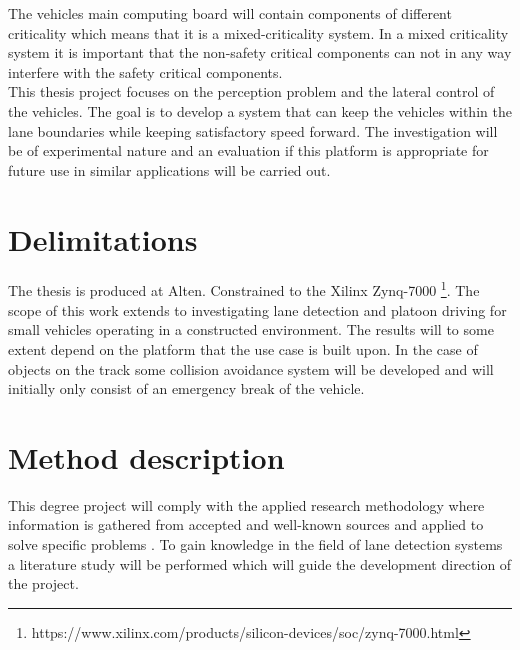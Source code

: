 The vehicles main computing board will contain components of different criticality which means that it is a mixed-criticality system. In a mixed criticality system it is important that the non-safety critical components can not in any way interfere with the safety critical components.\\


This thesis project focuses on the perception problem and the lateral control of the vehicles. The goal is to develop a system that can keep the vehicles within the lane boundaries while keeping satisfactory speed forward. The investigation will be of experimental nature and an evaluation if this platform is appropriate for future use in similar applications will be carried out.





\section{Delimitations}
The thesis is produced at Alten. Constrained to the Xilinx Zynq-7000 \footnote{https://www.xilinx.com/products/silicon-devices/soc/zynq-7000.html}. The scope of this work extends to investigating lane detection and platoon driving for small vehicles operating in a constructed environment. The results will to some extent depend on the platform that the use case is built upon. In the case of objects on the track some collision avoidance system will be developed and will initially only consist of an emergency break of the vehicle.

\section{Method description}
This degree project will comply with the applied research methodology where information is gathered from accepted and well-known sources and applied to solve specific problems \cite{haakansson2013portal}. To gain knowledge in the field of lane detection systems a literature study will be performed which will guide the development direction of the project.\\

